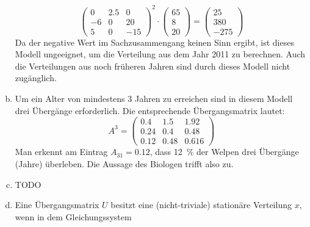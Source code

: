 \begin{exercise}
\begin{enumerate}[a)]
\begin{equation*}
              \begin{pmatrix}
                \num{0}  & \num{2.5} & \num{0}   \\
                -\num{6} & \num{0}   & \num{20}  \\
                \num{5}  & \num{0}   & -\num{15}
              \end{pmatrix}^2
              \cdot
              \begin{pmatrix}
                \num{65} \\
                \num{8}  \\
                \num{20}
              \end{pmatrix}
              =
              \begin{pmatrix}
                \num{25}  \\
                \num{380} \\
                -\num{275}
              \end{pmatrix}
            \end{equation*}
            Da der negative Wert im Sachzusammengang
            keinen Sinn ergibt, ist dieses Modell
            ungeeignet, um die Verteilung aus dem
            Jahr 2011 zu berechnen. Auch die
            Verteilungen aus noch früheren Jahren
            sind durch dieses Modell nicht
            zugänglich.
      \item Um ein Alter von mindestens 3 Jahren
            zu erreichen sind in diesem Modell
            drei Übergänge erforderlich.
            Die entsprechende Übergangsmatrix
            lautet:
            \begin{equation*}
              A^3=
              \begin{pmatrix}
                \num{0.4}  & \num{1.5}  & \num{1.92}  \\
                \num{0.24} & \num{0.4}  & \num{0.48}  \\
                \num{0.12} & \num{0.48} & \num{0.616}
              \end{pmatrix}
            \end{equation*}
            Man erkennt am Eintrag $A_{31}=\num{0.12}$,
            dass \SI{12}{\percent} der Welpen drei
            Übergänge (Jahre) überleben.
            Die Aussage des Biologen trifft also zu.
      \item TODO
      \item Eine Übergangsmatrix $U$ besitzt eine
            (nicht-triviale) stationäre Verteilung
            $x$, wenn in dem Gleichungssystem

\end{enumerate}
\end{exercise}

